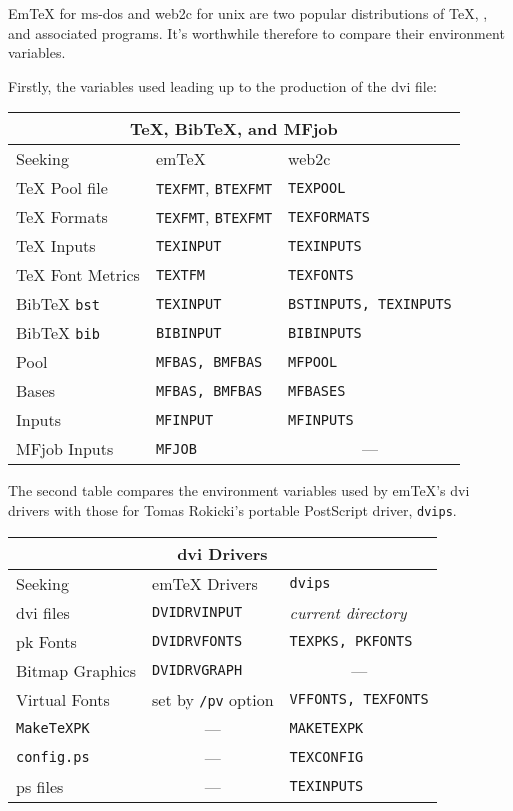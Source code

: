 Em\TeX{} for {\sc ms-dos} and {\sf web2c} for {\sc unix} are two
popular distributions of \TeX{}, \MF{}, and associated programs.
It's worthwhile therefore to compare their environment variables.

Firstly, the variables used leading up to the production of the
{\sc dvi} file:

\begin{center}
\begin{tabular}{|l|l|l|}
  \hline
  \multicolumn{3}{|c|}{\TeX{}, {\sc BibTeX}, \MF{} and {\sf MFjob}} \\
  \hline
  Seeking & em\TeX{} & {\sf web2c} \\
  \hline
  \TeX{} Pool file & {\tt TEXFMT}, {\tt BTEXFMT} & {\tt TEXPOOL} \\
  \TeX{} Formats & {\tt TEXFMT}, {\tt BTEXFMT} & {\tt TEXFORMATS} \\
  \TeX{} Inputs & {\tt TEXINPUT} & {\tt TEXINPUTS} \\
  \TeX{} Font Metrics & {\tt TEXTFM} & {\tt TEXFONTS} \\
  \hline
  {\sc BibTeX} {\tt bst} & {\tt TEXINPUT} & {\tt BSTINPUTS, TEXINPUTS} \\
  {\sc BibTeX} {\tt bib} & {\tt BIBINPUT} & {\tt BIBINPUTS} \\
  \hline
  \MF{} Pool & {\tt MFBAS, BMFBAS} & {\tt MFPOOL} \\
  \MF{} Bases & {\tt MFBAS, BMFBAS} & {\tt MFBASES} \\
  \MF{} Inputs & {\tt MFINPUT} & {\tt MFINPUTS} \\
  {\sf MFjob} Inputs & {\tt MFJOB} & \multicolumn{1}{c|}{---} \\
  \hline
\end{tabular}
\end{center}

The second table compares the environment variables used by em\TeX{}'s
{\sc dvi} drivers with those for Tomas {\sc Rokicki\/}'s portable
{\sf PostScript} driver, {\tt dvips}.

\begin{center}
\begin{tabular}{|l|l|l|}
  \hline
  \multicolumn{3}{|c|}{{\sc dvi} Drivers} \\
  \hline
  Seeking & em\TeX{} Drivers & {\tt dvips} \\
  \hline
  {\sc dvi} files & {\tt DVIDRVINPUT} & {\em current directory} \\
  {\sc pk} Fonts & {\tt DVIDRVFONTS} & {\tt TEXPKS, PKFONTS} \\
  Bitmap Graphics & {\tt DVIDRVGRAPH} & \multicolumn{1}{c|}{---} \\
  Virtual Fonts & set by {\tt /pv} option & {\tt VFFONTS, TEXFONTS} \\
  {\tt MakeTeXPK} & \multicolumn{1}{c|}{---} & {\tt MAKETEXPK} \\
  {\tt config.ps} & \multicolumn{1}{c|}{---} & {\tt TEXCONFIG} \\
  {\sc ps} files & \multicolumn{1}{c|}{---} & {\tt TEXINPUTS} \\
  \hline
\end{tabular}
\end{center}

